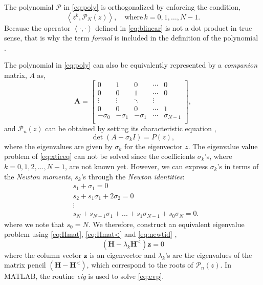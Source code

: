 The polynomial $\mathcal P$ in \eqref{eq:poly} is orthogonalized by enforcing the condition,
%
\begin{equation}
  \left \langle z^k, \mathcal {P}_N(z) \right \rangle, \quad \text{where} \, k = 0,1,\dots,N-1.
  \label{eq:orthogonalzie}
\end{equation}
%
Because the operator $\left \langle \cdot, \cdot \right \rangle$ defined in \eqref{eq:blinear} is not a dot product in true sense, that is why the term \emph{formal} is included in the definition of the polynomial \cite{Kravanja1999}.
%

The polynomial in \eqref{eq:poly} can also be equivalently represented by a \emph{companion} matrix, $A$ as,
%
\begin{equation}
  \mathbf A =
  \begin{bmatrix}
    0 & 1 & 0 & \cdots & 0 \\
    0 & 0 & 1 & \cdots & 0 \\
    \vdots & \vdots & \ddots & \vdots \\
    0 & 0 & 0 & \cdots & 1 \\
    -\sigma_0 & -\sigma_1 & -\sigma_1 & \cdots & \sigma_{N-1} \\
  \end{bmatrix},
  \label{eq:A}
\end{equation}
%
and $\mathcal P_n(z)$ can be obtained by setting its characteristic equation \cite{Gentle1998},
%
\begin{equation}
  \det( A - \sigma_k I) = P(z),
  \label{eq:xticeq}
\end{equation}
%
where the eigenvalues are given by $\sigma_k$ for the eigenvector $z$. The eigenvalue value problem of \eqref{eq:xticeq} can not be solved since the coefficients $\sigma_k$'s, where $k = 0, 1, 2, \dots, N-1 $, are not known yet. However, we can express $\sigma_k$'s in terms of the \emph{Newton moments}, $s_k$'s through the \emph{Newton identities}:
%
\begin{equation}
  \begin{aligned}
    & s_1 + \sigma_1 = 0 \\
    &  s_2 + s_1 \sigma_1 + 2 \sigma_2 = 0 \\
    &  {\vdots}\\
    &  s_N + s_{N-1} \sigma_{1} + ... + s_1 \sigma_{N-1} + s_0 \sigma_N = 0.
    \label{eq:newtid}
  \end{aligned}
\end{equation}
%
where we note that $s_0 = N$. We therefore, construct an equivalent eigenvalue problem using \eqref{eq:Hmat}, \eqref{eq:Hmat<} and \eqref{eq:newtid} \cite{Gillan2006c},
%
\begin{equation}
  \left( \mathbf H - \lambda_k \mathbf H^< \right) \mathbf z = 0
  \label{eq:evp}
\end{equation}
%
where the column vector $\mathbf{z}$ is an eigenvector and $\lambda_k$'s are the eigenvalues of the matrix pencil $(\mathbf H - \mathbf H^< )$, which correspond to the roots of $\mathcal P_n(z)$. In {MATLAB}, the routine \emph{eig} is used to solve \eqref{eq:evp}.
